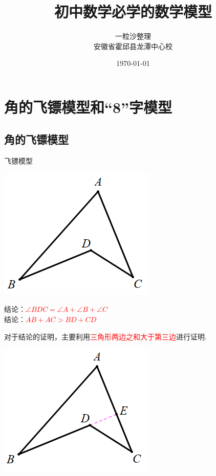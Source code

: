 \documentclass[10pt]{ctexart}
\title{初中数学必学的数学模型}
\author{一粒沙整理\\安徽省霍邱县龙潭中心校}
\date{\tiny\today}
\begin{document}
\maketitle
\tableofcontents


\section{角的飞镖模型和“8”字模型}
\subsection{角的飞镖模型}

\begin{custom}[explorecolor]{飞镖模型}
\begin{minipage}{0.3\textwidth}
 \includegraphics[scale=0.3]{figure/feibiao01.PNG}
\end{minipage}
\begin{minipage}{0.6\textwidth}
结论：\textcolor{red}{$\angle BDC=\angle A+\angle B+\angle C$}\\
结论：\textcolor{red}{$AB+AC>BD+CD$}
\end{minipage}
\end{custom}

对于结论的证明，主要利用\textcolor{red}{三角形两边之和大于第三边}进行证明.

\begin{minipage}{0.6\textwidth}

\kaishu\color{cyan}{证明：延长$BD$，交$AC$于点$E$，如图.\\
$\because AB+AE>BE, CE+DE>CD\\ 
\therefore AB+AE+CE+DE>BE+CD\\
\therefore AB+AC+DE>BD+DE+CD\\
\therefore AB+AC>BD+CD$}
\end{minipage}
\begin{minipage}{0.4\textwidth}
 \includegraphics[scale=0.5]{figure/feibiao02.PNG}
\end{minipage}
\end{document}
